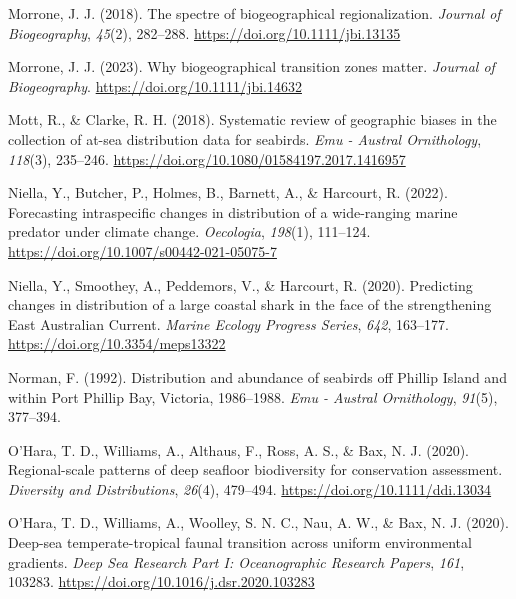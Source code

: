 \documentclass{article}
\newlength{\cslhangindent}
\newlength{\cslentryspacingunit} %
\newenvironment{CSLReferences}[2] %
 {%
  \setlength{\parindent}{0pt}
  \ifodd #1
  \let\oldpar\par
  \def\par{\hangindent=\cslhangindent\oldpar}
  \fi
  \setlength{\parskip}{#2\cslentryspacingunit}
 }%
 {}
\begin{document}
\begin{linenumbers}
\begin{CSLReferences}{1}{0}
\leavevmode{}%
Morrone, J. J. (2018). The spectre of biogeographical regionalization. \emph{Journal of Biogeography}, \emph{45}(2), 282--288. \url{https://doi.org/10.1111/jbi.13135}

\leavevmode{}%
Morrone, J. J. (2023). Why biogeographical transition zones matter. \emph{Journal of Biogeography}. \url{https://doi.org/10.1111/jbi.14632}

\leavevmode{}%
Mott, R., \& Clarke, R. H. (2018). Systematic review of geographic biases in the collection of at-sea distribution data for seabirds. \emph{Emu - Austral Ornithology}, \emph{118}(3), 235--246. \url{https://doi.org/10.1080/01584197.2017.1416957}

\leavevmode{}%
Niella, Y., Butcher, P., Holmes, B., Barnett, A., \& Harcourt, R. (2022). Forecasting intraspecific changes in distribution of a wide-ranging marine predator under climate change. \emph{Oecologia}, \emph{198}(1), 111--124. \url{https://doi.org/10.1007/s00442-021-05075-7}

\leavevmode{}%
Niella, Y., Smoothey, A., Peddemors, V., \& Harcourt, R. (2020). Predicting changes in distribution of a large coastal shark in the face of the strengthening East Australian Current. \emph{Marine Ecology Progress Series}, \emph{642}, 163--177. \url{https://doi.org/10.3354/meps13322}

\leavevmode{}%
Norman, F. (1992). Distribution and abundance of seabirds off {P}hillip {I}sland and within {P}ort {P}hillip {B}ay, {V}ictoria, 1986--1988. \emph{Emu - Austral Ornithology}, \emph{91}(5), 377--394.

\leavevmode{}%
O'Hara, T. D., Williams, A., Althaus, F., Ross, A. S., \& Bax, N. J. (2020). Regional-scale patterns of deep seafloor biodiversity for conservation assessment. \emph{Diversity and Distributions}, \emph{26}(4), 479--494. \url{https://doi.org/10.1111/ddi.13034}

\leavevmode{}%
O'Hara, T. D., Williams, A., Woolley, S. N. C., Nau, A. W., \& Bax, N. J. (2020). Deep-sea temperate-tropical faunal transition across uniform environmental gradients. \emph{Deep Sea Research Part I: Oceanographic Research Papers}, \emph{161}, 103283. \url{https://doi.org/10.1016/j.dsr.2020.103283}


\end{CSLReferences}
\end{linenumbers}
\end{document}
